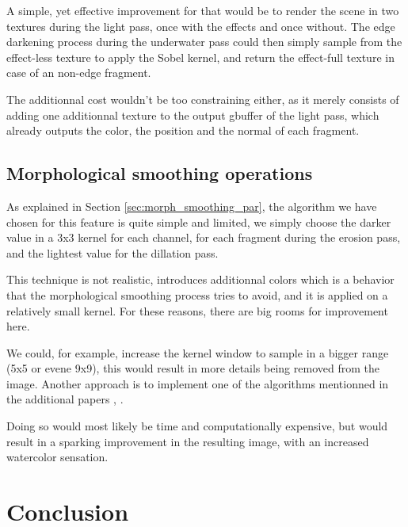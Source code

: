 \documentclass{article}
\begin{document}
\medskip \par
\noindent
A simple, yet effective improvement for that would be to render the scene in two textures during the light pass,
once with the effects and once without. The edge darkening process during the underwater pass could then simply
sample from the effect-less texture to apply the Sobel kernel, and return the effect-full texture in case of an
non-edge fragment.

\medskip \par
\noindent
The additionnal cost wouldn't be too constraining either, as it merely consists of adding one additionnal texture to 
the output gbuffer of the light pass, which already outputs the color, the position and the normal of each fragment.


\subsection{Morphological smoothing operations} 

As explained in Section \ref{sec:morph_smoothing_par}, the algorithm we have chosen for this feature is quite simple
and limited, we simply choose the darker value in a 3x3 kernel for each channel, for each fragment during the erosion pass,
and the lightest value for the dillation pass. 

\medskip \par
\noindent
This technique is not realistic, introduces additionnal colors which is a behavior that the morphological 
smoothing process tries to avoid, and it is applied on a relatively small kernel. For these reasons, there are big 
rooms for improvement here. 

\medskip \par
\noindent
We could, for example, increase the kernel window to sample in a bigger range (5x5 or evene 9x9), this would 
result in more details being removed from the image. Another approach is to implement one of the algorithms 
mentionned in the additional papers \cite{morph_colors_1}, \cite{morph_colors_2}. 

\medskip \par
\noindent
Doing so would most likely be time and computationally expensive, but would result in a sparking improvement 
in the resulting image, with an increased watercolor sensation.



\newpage
\section{Conclusion}
\end{document}
